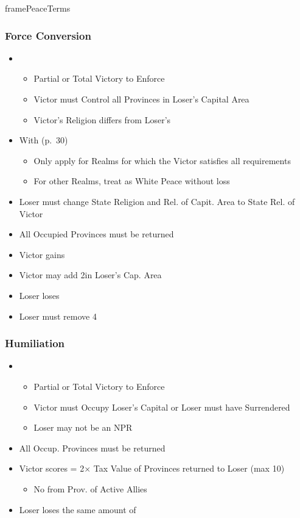 \documentclass[10pt]{article}
\begin{document}
\begin{dynamiccontents*}{framePeaceTerms}
\begin{multicols}{3}
		\subsubsection*{Force Conversion}
		\begin{itemize}
			\item {}
			\begin{itemize}
				\item Partial or Total Victory to Enforce
				\item Victor must Control all Provinces in Loser's Capital Area
				\item Victor's Religion differs from Loser's
			\end{itemize}
			\item With  (p.~30)
			\begin{itemize}
				\item Only apply for Realms for which the Victor satisfies all requirements
				\item For other Realms, treat as White Peace without \prestige loss
			\end{itemize}
			\item Loser must change State Religion and Rel. of Capit. Area to State Rel. of Victor
			\item All Occupied Provinces must be returned
			\item Victor gains 
			\item Victor may add 2\influence in Loser's Cap. Area
			\item Loser loses 
			\item Loser must remove 4\influence
		\end{itemize}

		\subsubsection*{Humiliation}
		\begin{itemize}
			\item {}
			\begin{itemize}
				\item Partial or Total Victory to Enforce
				\item Victor must Occupy Loser's Capital or Loser must have Surrendered
				\item Loser may not be an NPR
			\end{itemize}
			\item All Occup. Provinces must be returned
			\item Victor scores \prestige = 2× Tax Value of Provinces returned to Loser (max 10)
			\begin{itemize}
				\item No \prestige from Prov. of Active Allies
			\end{itemize}
			\item Loser loses the same amount of \prestige
		\end{itemize}


\end{multicols}
\end{dynamiccontents*}
\end{document}
